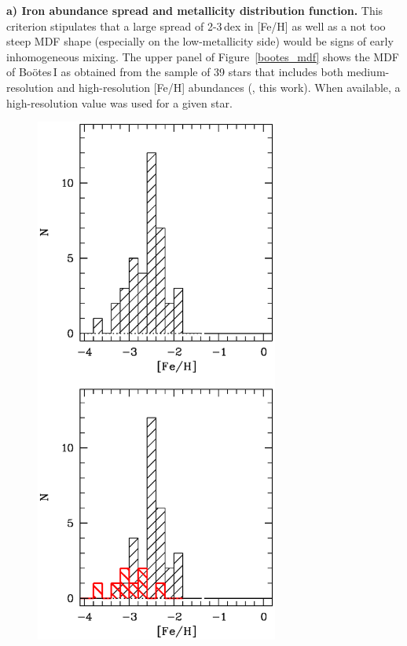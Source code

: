 \documentclass[]{emulateapj}
\begin{document}
\textbf{a) Iron abundance spread and metallicity distribution
  function.} This criterion stipulates that a large spread of 2-3\,dex
in [Fe/H] as well as a not too steep MDF shape (especially on the
low-metallicity side) would be signs of early inhomogeneous
mixing. The upper panel of Figure~\ref{bootes_mdf} shows the MDF of
Bo\"otes\,I as obtained from the sample of 39 stars that includes both
medium-resolution and high-resolution [Fe/H] abundances
(\citealt{norris10_booseg,lai11,feltzing09, norris10, gilmore13,
  ishigaki14}, this work). When available, a high-resolution value was
used for a given star.

\begin{figure}[!th]                                             
 \begin{center}                                                               
   \includegraphics[clip=true,width=8cm,bbllx=67, bblly=130,
     bburx=400, bbury=750]{bootes_mdf} 
 \end{center}                                                              
\end{figure}                                    
\end{document}
